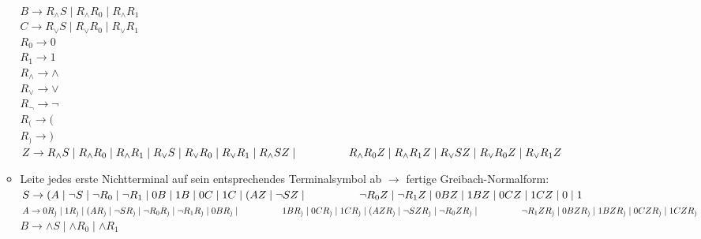 \documentclass[11pt]{article}
\begin{document}
\begin{enumerate}
\begin{itemize}
\\\hspace*{6mm} $B \rightarrow R_{\wedge} S \mid R_{\wedge}R_{0} \mid R_{\wedge}R_{1}$
\\\hspace*{6mm} $C \rightarrow R_{\vee} S \mid R_{\vee}R_{0} \mid R_{\vee}R_{1}$
\\\hspace*{6mm} $R_{0} \rightarrow 0$
\\\hspace*{6mm} $R_{1} \rightarrow 1$
\\\hspace*{6mm} $R_{\wedge} \rightarrow \wedge$
\\\hspace*{6mm} $R_{\vee} \rightarrow \vee$
\\\hspace*{6mm} $R_{\neg} \rightarrow \neg$
\\\hspace*{6mm} $R_{(} \rightarrow ($
\\\hspace*{6mm} $R_{)} \rightarrow )$
\\\hspace*{6mm} $Z \rightarrow R_{\wedge} S \mid R_{\wedge}R_{0} \mid R_{\wedge}R_{1} \mid R_{\vee} S \mid R_{\vee}R_{0} \mid R_{\vee}R_{1} \mid R_{\wedge} SZ \mid \hspace*{16mm}R_{\wedge}R_{0}Z \mid R_{\wedge}R_{1}Z \mid R_{\vee} SZ \mid R_{\vee}R_{0}Z \mid R_{\vee}R_{1}Z$
\item Leite jedes erste Nichtterminal auf sein entsprechendes Terminalsymbol ab $\rightarrow$ fertige Greibach-Normalform:
\\\hspace*{6mm} $S \rightarrow (A\mid \neg S \mid \neg R_{0} \mid \neg R_{1} \mid 0B \mid 1B \mid 0 C \mid 1C \mid (AZ \mid \neg SZ \mid \hspace*{16,5mm} \neg R_{0}Z \mid \neg R_{1}Z \mid 0BZ \mid 1BZ \mid  0 CZ \mid 1 CZ\mid 0\mid 1$
\\\hspace*{6mm} $A \rightarrow 0R_{)}\mid 1R_{)}\mid (AR_{)}\mid \neg SR_{)} \mid \neg R_{0}R_{)} \mid \neg R_{1}R_{)} \mid 0BR_{)} \mid \hspace*{16,5mm} 1BR_{)} \mid 0 CR_{)} \mid 1CR_{)} \mid (AZR_{)} \mid \neg SZR_{)} \mid \neg R_{0}ZR_{)} \mid \hspace*{16,5mm}\neg R_{1}ZR_{)} \mid 0BZR_{)} \mid 1BZR_{)} \mid 0 CZR_{)} \mid 1CZR_{)}$
\\\hspace*{6mm} $B \rightarrow \wedge S \mid \wedge R_{0} \mid \wedge R_{1}$

\end{itemize}
\end{enumerate}
\end{document}
